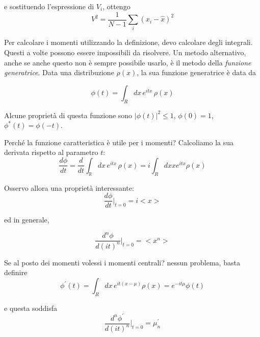 \documentclass{report}
\begin{document}
e sostituendo l'espressione di $V_i$, ottengo
\begin{equation}
    V^2 = \frac{1}{N-1}\sum_i(x_i - \hat{x})^2
\end{equation}

Per calcolare i momenti utilizzando la definizione, devo calcolare degli integrali. Questi a volte possono essere impossibili da risolvere. Un metodo alternativo, anche se anche questo non è sempre possibile usarlo, è il metodo della \emph{funzione generatrice}. Data una distribuzione $\rho(x)$, la sua funzione generatrice è data da 
\begin{tcolorbox}[colback=doc!10, colframe=black, boxrule=1pt]
\begin{equation}
    \label{caracteristic_function}
    \phi(t) = \int_Rdx \, e^{itx}\, \rho(x)
\end{equation}
\end{tcolorbox}

Alcune proprietà di questa funzione sono $|\phi(t)|^2 \leq 1$, $\phi(0)= 1$, $\phi^*(t) = \phi(-t)$. 

Perché la funzione caratteristica è utile per i momenti? Calcoliamo la sua derivata rispetto al parametro $t$: 
\begin{equation}
    \frac{d\phi}{dt} = \frac{d}{dt}\int_{\mathbb{R}}dx \, e^{itx}\, \rho(x) = i\int_R dx x e^{itx}\rho(x) 
\end{equation}

Osservo allora una proprietà interessante: 
\begin{equation}
    \frac{d\phi}{dt}\biggr|_{t=0} = i<x>
\end{equation}

ed in generale, 
\begin{tcolorbox}[colback=doc!10, colframe=black, boxrule=1pt]
\begin{equation}
    \frac{d^n\phi}{d(it)^n}\biggr|_{t=0}= <x^n>
\end{equation}
\end{tcolorbox}

Se al posto dei momenti volessi i momenti centrali? nessun problema, basta definire 
\begin{equation}
    \phi^{'}(t) = \int_R dx \, e^{it(x-\mu)}\rho(x) = e^{-it\mu}\phi(t)
\end{equation}

e questa soddisfa 
\begin{equation}
    \frac{d^n\phi^{'}}{d(it)^n}\biggr|_{t=0}= \mu^{'}_n
\end{equation}
\end{document}

